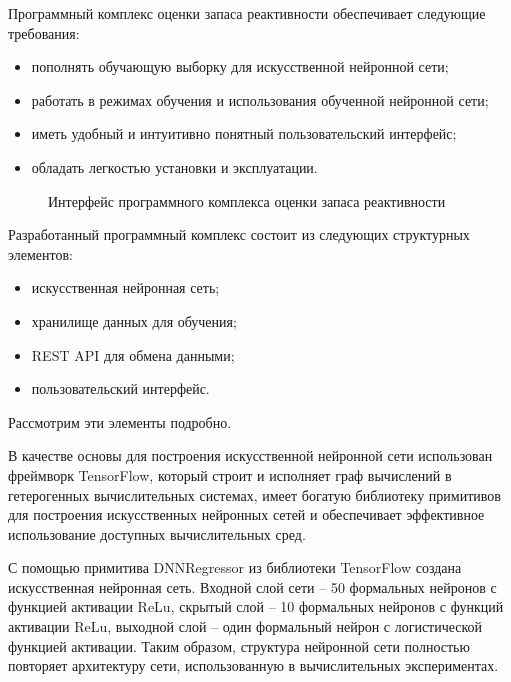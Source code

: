 Программный комплекс оценки запаса реактивности обеспечивает следующие
требования:

\begin{itemize}
    \item
    пополнять обучающую выборку для искусственной нейронной сети;
    \item
    работать в режимах обучения и использования обученной нейронной сети;
    \item
    иметь удобный и интуитивно понятный пользовательский интерфейс;
    \item
    обладать легкостью установки и эксплуатации.
\end{itemize}

\begin{figure}[p]
    \caption[Интерфейс программного комплекса оценки запаса реактивности]{Интерфейс программного комплекса оценки запаса реактивности}
    \label{pic:wwrc-gui}
\end{figure}

Разработанный программный комплекс состоит из следующих структурных
элементов:
\begin{itemize}
    \item искусственная нейронная сеть;
    \item хранилище данных для обучения;
    \item REST API для обмена данными;
    \item пользовательский интерфейс.
\end{itemize}

Рассмотрим эти элементы подробно.

В качестве основы для построения искусственной нейронной сети
использован фреймворк TensorFlow\cite{tensorflow2015-whitepaper,tenosrflow-2017,gs-tensorflow-2016}, который строит и исполняет граф вычислений в гетерогенных вычислительных системах, имеет богатую библиотеку примитивов для построения искусственных нейронных сетей и обеспечивает эффективное использование доступных вычислительных сред.

С помощью примитива DNNRegressor из библиотеки TensorFlow создана
искусственная нейронная сеть.
Входной слой сети -- 50 формальных нейронов с функцией активации ReLu, скрытый слой -- 10 формальных нейронов с функций активации ReLu, выходной слой -- один формальный нейрон с логистической функцией активации.
Таким образом, структура нейронной сети полностью повторяет архитектуру сети, использованную в вычислительных экспериментах.

